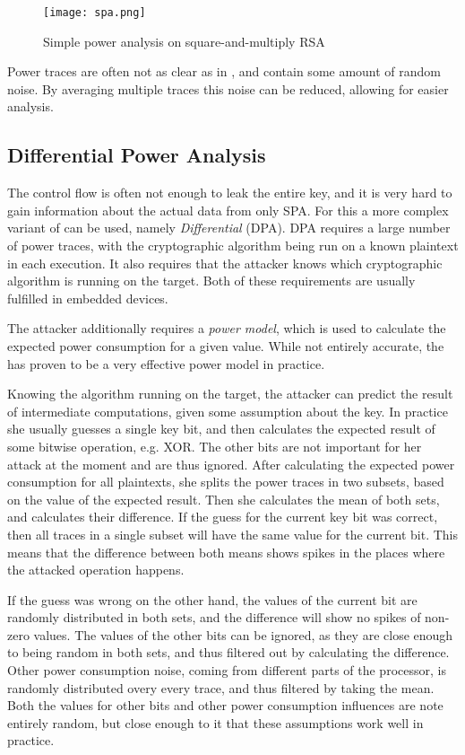 \begin{figure}[h]
  \centering
  \texttt{[image: spa.png]}
  \caption{Simple power analysis on square-and-multiply RSA\cite{boehme2017netsec}}
  \label{fig:spa}
\end{figure}

Power traces are often not as clear as in , and contain some amount of random noise.
By averaging multiple traces this noise can be reduced, allowing for easier analysis.

\subsection{Differential Power Analysis}
The control flow is often not enough to leak the entire key, and it is very hard to gain information about the actual data from only SPA.
For this a more complex variant of \poweranalysis{} can be used, namely \emph{Differential \poweranalysis{}} (DPA).
DPA requires a large number of power traces, with the cryptographic algorithm being run on a known plaintext in each execution.
It also requires that the attacker knows which cryptographic algorithm is running on the target.
Both of these requirements are usually fulfilled in embedded devices.

The attacker additionally requires a \emph{power model}, which is used to calculate the expected power consumption for a given value.
While not entirely accurate\cite{brier2004correlation}, the \hammingw{} has proven to be a very effective power model in practice.

Knowing the algorithm running on the target, the attacker can predict the result of intermediate computations, given some assumption about the key.
In practice she usually guesses a single key bit, and then calculates the expected result of some bitwise operation, e.g. XOR.
The other bits are not important for her attack at the moment and are thus ignored.
After calculating the expected power consumption for all plaintexts, she splits the power traces in two subsets, based on the value of the expected result.
Then she calculates the mean of both sets, and calculates their difference.
If the guess for the current key bit was correct, then all traces in a single subset will have the same value for the current bit.
This means that the difference between both means shows spikes in the places where the attacked operation happens.

If the guess was wrong on the other hand, the values of the current bit are randomly distributed in both sets, and the difference will show no spikes of non-zero values.
The values of the other bits can be ignored, as they are close enough to being random in both sets, and thus filtered out by calculating the difference.
Other power consumption noise, coming from different parts of the processor, is randomly distributed overy every trace, and thus filtered by taking the mean.
Both the values for other bits and other power consumption influences are note entirely random, but close enough to it that these assumptions work well in practice.

